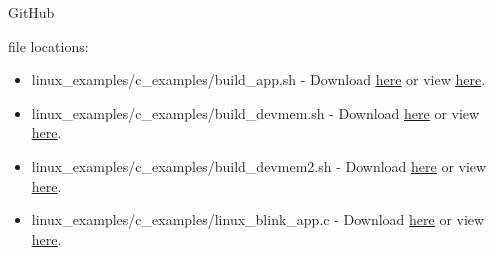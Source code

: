 \begin{flushleft}
\begin{enumerate}[
	label=\textbf{Step \arabic*.},
	leftmargin=*,
	widest={00},
	align=left]
\hypertarget{GitHub-files}{GitHub} file locations:

\begin{itemize}

\item linux\_examples/c\_examples/build\_app.sh - Download \href{\TheRawURL/MyFirstHPSSystem/writeup_linux/c_examples/build_app.sh}{\underline{here}} or view \href{\TheBlobURL/MyFirstHPSSystem/writeup_linux/c_examples/build_app.sh}{\underline{here}}.

\item linux\_examples/c\_examples/build\_devmem.sh - Download \href{\TheRawURL/MyFirstHPSSystem/writeup_linux/c_examples/build_devmem.sh}{\underline{here}} or view \href{\TheBlobURL/MyFirstHPSSystem/writeup_linux/c_examples/build_devmem.sh}{\underline{here}}.

\item linux\_examples/c\_examples/build\_devmem2.sh - Download \href{\TheRawURL/MyFirstHPSSystem/writeup_linux/c_examples/build_devmem2.sh}{\underline{here}} or view \href{\TheBlobURL/MyFirstHPSSystem/writeup_linux/c_examples/build_devmem2.sh}{\underline{here}}.

\item linux\_examples/c\_examples/linux\_blink\_app.c - Download \href{\TheRawURL/MyFirstHPSSystem/writeup_linux/c_examples/linux_blink_app.c}{\underline{here}} or view \href{\TheBlobURL/MyFirstHPSSystem/writeup_linux/c_examples/linux_blink_app.c}{\underline{here}}.



\end{itemize}
\end{enumerate}
\end{flushleft}
